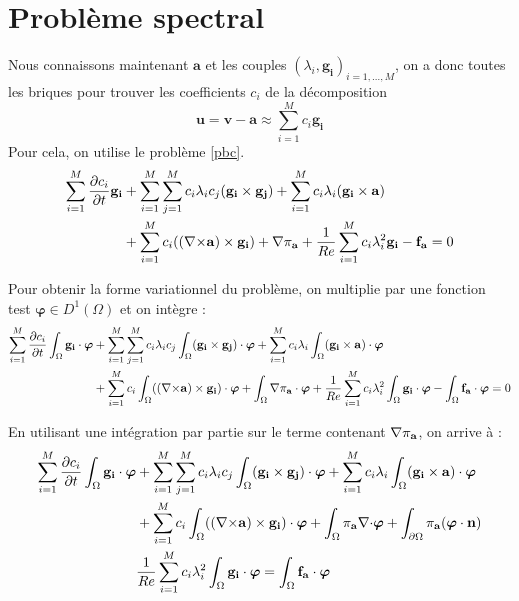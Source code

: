 \section{Problème spectral}
\label{spectre}
Nous connaissons maintenant $\mathbf{a}$ et les couples $(\lambda_i,\mathbf{g_i})_{i=1,\dots,M}$, on a donc toutes les briques pour trouver les coefficients $c_i$ de la décomposition
\[\mathbf{u}=\mathbf{v}-\mathbf{a} \approx \sum_{i=1}^M c_i\mathbf{g_i}\]
Pour cela, on utilise le problème \ref{pbc}.
\begin{align*}
\sum_{i=1}^M\frac{\partial c_i}{\partial t}\mathbf{g_i} &+ \sum_{i=1}^M\sum_{j=1}^Mc_i\lambda_ic_j(\mathbf{g_i}\times \mathbf{g_j}) + \sum_{i=1}^Mc_i\lambda_i(\mathbf{g_i}\times \mathbf{a})\\
& +  \sum_{i=1}^Mc_i(({\nabla\times}\mathbf{a})\times \mathbf{g_i}) + {\nabla} \pi_{\mathbf{a}} +\frac{1}{Re}\sum_{i=1}^Mc_i\lambda_i^2\mathbf{g_i} - \mathbf{f_a} = 0\\
\end{align*}

Pour obtenir la forme variationnel du problème, on multiplie par une fonction test $\bm{\varphi}\in D^1(\Omega)$ et on intègre :
\begin{align*}
\sum_{i=1}^M\frac{\partial c_i}{\partial t}\int_\Omega\mathbf{g_i}\cdot\bm{\varphi} &+ \sum_{i=1}^M\sum_{j=1}^Mc_i\lambda_ic_j\int_\Omega(\mathbf{g_i}\times \mathbf{g_j})\cdot\bm{\varphi} + \sum_{i=1}^Mc_i\lambda_i\int_\Omega(\mathbf{g_i}\times \mathbf{a})\cdot\bm{\varphi}\\
& +  \sum_{i=1}^Mc_i\int_\Omega(({\nabla\times}\mathbf{a})\times \mathbf{g_i})\cdot\bm{\varphi} + \int_\Omega{\nabla} \pi_{\mathbf{a}}\cdot\bm{\varphi} +\frac{1}{Re}\sum_{i=1}^Mc_i\lambda_i^2\int_\Omega\mathbf{g_i}\cdot\bm{\varphi} - \int_\Omega\mathbf{f_a}\cdot\bm{\varphi} = 0\\
\end{align*}

En utilisant une intégration par partie sur le terme contenant ${\nabla}\pi_{\mathbf{a}}$, on arrive à :
\begin{align*}
\sum_{i=1}^M\frac{\partial c_i}{\partial t}\int_\Omega\mathbf{g_i}\cdot\bm{\varphi} &+ \sum_{i=1}^M\sum_{j=1}^Mc_i\lambda_ic_j\int_\Omega(\mathbf{g_i}\times \mathbf{g_j})\cdot\bm{\varphi} + \sum_{i=1}^Mc_i\lambda_i\int_\Omega(\mathbf{g_i}\times \mathbf{a})\cdot\bm{\varphi}\\
& +  \sum_{i=1}^Mc_i\int_\Omega(({\nabla\times}\mathbf{a})\times \mathbf{g_i})\cdot\bm{\varphi} + \int_\Omega\pi_{\mathbf{a}}{\nabla\cdot}\bm{\varphi} + \int_{\partial\Omega}\pi_{\mathbf{a}}(\bm{\varphi}\cdot\mathbf{n})\\
& \frac{1}{Re}\sum_{i=1}^Mc_i\lambda_i^2\int_\Omega\mathbf{g_i}\cdot\bm{\varphi} = \int_\Omega\mathbf{f_a}\cdot\bm{\varphi}\\
\end{align*}

